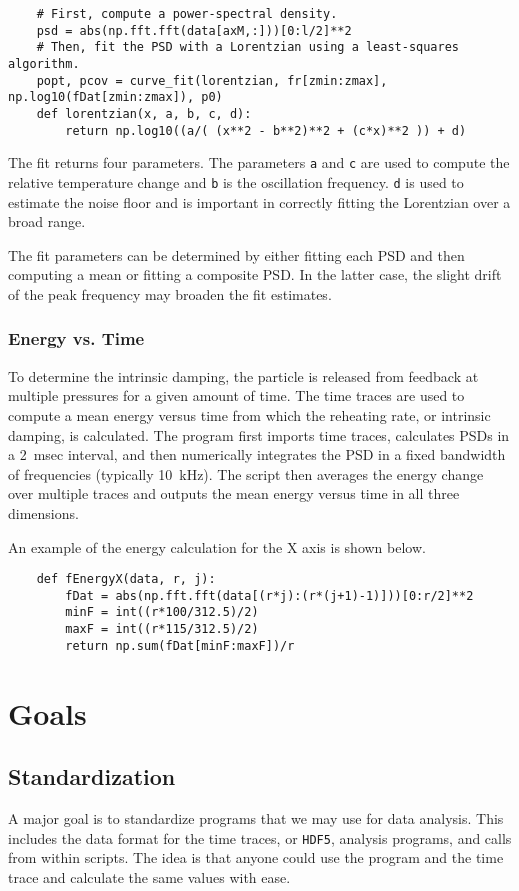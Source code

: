 \documentclass[a4paper,11pt,fleqn,english]{amsart}
\begin{document}
\begin{lstlisting}
	# First, compute a power-spectral density.
	psd = abs(np.fft.fft(data[axM,:]))[0:l/2]**2
	# Then, fit the PSD with a Lorentzian using a least-squares algorithm.
	popt, pcov = curve_fit(lorentzian, fr[zmin:zmax], np.log10(fDat[zmin:zmax]), p0)
	def lorentzian(x, a, b, c, d):
		return np.log10((a/( (x**2 - b**2)**2 + (c*x)**2 )) + d)
\end{lstlisting}

The fit returns four parameters. The parameters \texttt{a} and \texttt{c} are used to compute the relative temperature change and \texttt{b} is the oscillation frequency. \texttt{d} is used to estimate the noise floor and is important in correctly fitting the Lorentzian over a broad range.

The fit parameters can be determined by either fitting each PSD and then computing a mean or fitting a composite PSD. In the latter case, the slight drift of the peak frequency may broaden the fit estimates.

\subsubsection{Energy vs. Time} To determine the intrinsic damping, the particle is released from feedback at multiple pressures for a given amount of time. The time traces are used to compute a mean energy versus time from which the reheating rate, or intrinsic damping, is calculated. The program first imports time traces, calculates PSDs in a 2~msec interval, and then numerically integrates the PSD in a fixed bandwidth of frequencies (typically 10~kHz). The script then averages the energy change over multiple traces and outputs the mean energy versus time in all three dimensions.

An example of the energy calculation for the X axis is shown below.

\begin{lstlisting}
	def fEnergyX(data, r, j):
		fDat = abs(np.fft.fft(data[(r*j):(r*(j+1)-1)]))[0:r/2]**2
		minF = int((r*100/312.5)/2)
		maxF = int((r*115/312.5)/2)
		return np.sum(fDat[minF:maxF])/r
\end{lstlisting}

\section{Goals}

\subsection{Standardization} A major goal is to standardize programs that we may use for data analysis. This includes the data format for the time traces, or \texttt{HDF5}, analysis programs, and calls from within scripts. The idea is that anyone could use the program and the time trace and calculate the same values with ease.
\end{document}
